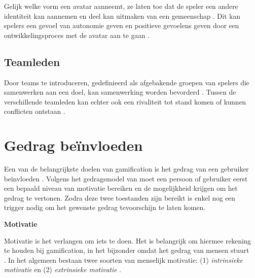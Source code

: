 Gelijk welke vorm een avatar aanneemt, ze laten toe dat de speler een andere identiteit kan aannemen en deel kan uitmaken van een gemeenschap \autocite{Annetta2010}. Dit kan spelers een gevoel van autonomie geven en positieve gevoelens geven door een ontwikkelingsproces met de avatar aan te gaan \autocite{Sailer2013}.

\subsection{Teamleden}

Door teams te introduceren, gedefinieerd als afgebakende groepen van spelers die samenwerken aan een doel, kan samenwerking worden bevorderd \autocite{Sailer2016}. Tussen de verschillende teamleden kan echter ook een rivaliteit tot stand komen of kunnen conflicten ontstaan \autocite{Kapp2012}.

\section{Gedrag beïnvloeden}

Een van de belangrijkste doelen van gamification is het gedrag van een gebruiker beïnvloeden \autocite{AlMarshedi2015}. Volgens het gedragsmodel van \textcite{Fogg2009} moet een persoon of gebruiker eerst een bepaald niveau van motivatie bereiken en de mogelijkheid krijgen om het gedrag te vertonen. Zodra deze twee toestanden zijn bereikt is enkel nog een trigger nodig om het gewenste gedrag tevoorschijn te laten komen.

\textbf{Motivatie}

Motivatie is het verlangen om iets te doen. Het is belangrijk om hiermee rekening te houden bij gamification, in het bijzonder omdat het gedrag van mensen stuurt \autocite{AlMarshedi2015}. In het algemeen bestaan twee soorten van menselijk motivatie: (1) \textit{intrinsieke motivatie} en (2) \textit{extrinsieke motivatie} \autocite{Yang2017}.

